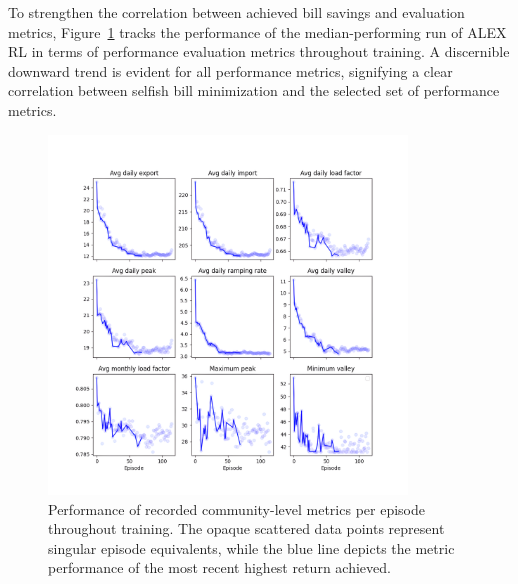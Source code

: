 \documentclass[preprint, 12pt]{elsarticle}
\begin{document}
To strengthen the correlation between achieved bill savings and evaluation metrics, Figure~\ref{fig: metrics_during_learning} tracks the performance of the median-performing run of ALEX RL in terms of performance evaluation metrics throughout training. A discernible downward trend is evident for all performance metrics, signifying a clear correlation between selfish bill minimization and the selected set of performance metrics.
\begin{figure}[h]
    \centering
\includegraphics[width=0.85\textwidth]{Figures/ResultsPlot_highres.png}
    \caption{Performance of recorded community-level metrics per episode throughout training. The opaque scattered data points represent singular episode equivalents, while the blue line depicts the metric performance of the most recent highest return achieved.}
    \label{fig: metrics_during_learning}
\end{figure}
\end{document}
